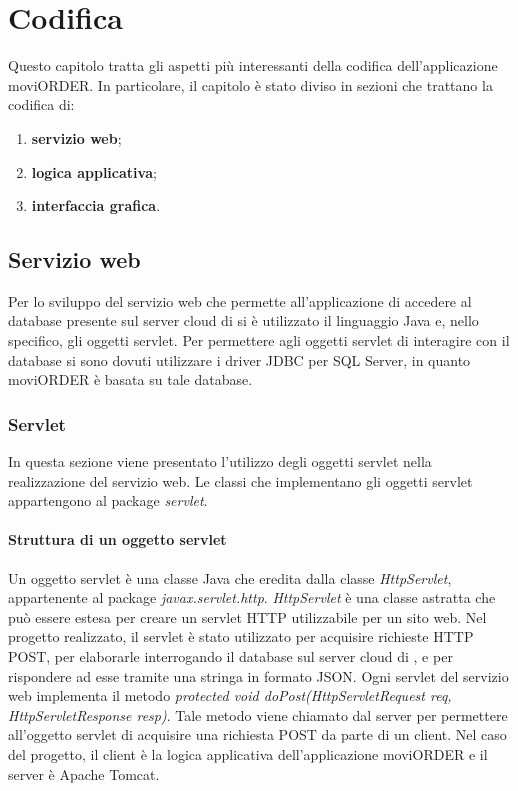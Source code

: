 \chapter{Codifica}

Questo capitolo tratta gli aspetti più interessanti della codifica dell'applicazione moviORDER. In particolare, il capitolo è stato diviso in sezioni che trattano la codifica di:
\begin{enumerate}
	\item \textbf{servizio web};
	\item \textbf{logica applicativa};
	\item \textbf{interfaccia grafica}.
\end{enumerate}

\section{Servizio web}

Per lo sviluppo del servizio web che permette all'applicazione di accedere al database presente sul server cloud di \visione{} si è utilizzato il linguaggio Java e, nello specifico, gli oggetti servlet. Per permettere agli oggetti servlet di interagire con il database si sono dovuti utilizzare i driver JDBC per SQL Server, in quanto moviORDER è basata su tale database. 

\subsection{Servlet}

In questa sezione viene presentato l'utilizzo degli oggetti servlet nella realizzazione del servizio web. Le classi che implementano gli oggetti servlet appartengono al package \textit{servlet}.

\subsubsection{Struttura di un oggetto servlet}

Un oggetto servlet è una classe Java che eredita dalla classe \textit{HttpServlet}, appartenente al package \textit{javax.servlet.http}. \textit{HttpServlet} è una classe astratta che può essere estesa per creare un servlet HTTP utilizzabile per un sito web. Nel progetto realizzato, il servlet è stato utilizzato per acquisire richieste HTTP POST, per elaborarle interrogando il database sul server cloud di \visione{}, e per rispondere ad esse tramite una stringa in formato JSON. Ogni servlet del servizio web implementa il metodo \textit{protected void doPost(HttpServletRequest req, HttpServletResponse resp)}. Tale metodo viene chiamato dal server per permettere all'oggetto servlet di acquisire una richiesta POST da parte di un client. Nel caso del progetto, il client è la logica applicativa dell'applicazione moviORDER e il server è Apache Tomcat.

